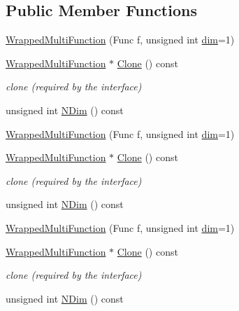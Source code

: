 \subsection*{Public Member Functions}
\begin{DoxyCompactItemize}
\item 
\mbox{\hyperlink{classROOT_1_1Math_1_1WrappedMultiFunction_a015f33dec6c241c6b5662df06ea4ddb9}{Wrapped\+Multi\+Function}} (Func f, unsigned int \mbox{\hyperlink{adat__devel_2lib_2hadron_2irrep__util_8cc_a70b5e28b5bc3d1b63a7435c5fe50b837}{dim}}=1)
\item 
\mbox{\hyperlink{classROOT_1_1Math_1_1WrappedMultiFunction}{Wrapped\+Multi\+Function}} $\ast$ \mbox{\hyperlink{classROOT_1_1Math_1_1WrappedMultiFunction_aafa24e359a607b4278f1bf238bdbc336}{Clone}} () const
\begin{DoxyCompactList}\small\item\em clone (required by the interface) \end{DoxyCompactList}\item 
unsigned int \mbox{\hyperlink{classROOT_1_1Math_1_1WrappedMultiFunction_a99de9f7a6e26b03b1cdcf35d8c62d761}{N\+Dim}} () const
\item 
\mbox{\hyperlink{classROOT_1_1Math_1_1WrappedMultiFunction_a015f33dec6c241c6b5662df06ea4ddb9}{Wrapped\+Multi\+Function}} (Func f, unsigned int \mbox{\hyperlink{adat__devel_2lib_2hadron_2irrep__util_8cc_a70b5e28b5bc3d1b63a7435c5fe50b837}{dim}}=1)
\item 
\mbox{\hyperlink{classROOT_1_1Math_1_1WrappedMultiFunction}{Wrapped\+Multi\+Function}} $\ast$ \mbox{\hyperlink{classROOT_1_1Math_1_1WrappedMultiFunction_aafa24e359a607b4278f1bf238bdbc336}{Clone}} () const
\begin{DoxyCompactList}\small\item\em clone (required by the interface) \end{DoxyCompactList}\item 
unsigned int \mbox{\hyperlink{classROOT_1_1Math_1_1WrappedMultiFunction_a99de9f7a6e26b03b1cdcf35d8c62d761}{N\+Dim}} () const
\item 
\mbox{\hyperlink{classROOT_1_1Math_1_1WrappedMultiFunction_a015f33dec6c241c6b5662df06ea4ddb9}{Wrapped\+Multi\+Function}} (Func f, unsigned int \mbox{\hyperlink{adat__devel_2lib_2hadron_2irrep__util_8cc_a70b5e28b5bc3d1b63a7435c5fe50b837}{dim}}=1)
\item 
\mbox{\hyperlink{classROOT_1_1Math_1_1WrappedMultiFunction}{Wrapped\+Multi\+Function}} $\ast$ \mbox{\hyperlink{classROOT_1_1Math_1_1WrappedMultiFunction_aafa24e359a607b4278f1bf238bdbc336}{Clone}} () const
\begin{DoxyCompactList}\small\item\em clone (required by the interface) \end{DoxyCompactList}\item 
unsigned int \mbox{\hyperlink{classROOT_1_1Math_1_1WrappedMultiFunction_a99de9f7a6e26b03b1cdcf35d8c62d761}{N\+Dim}} () const
\end{DoxyCompactItemize}
